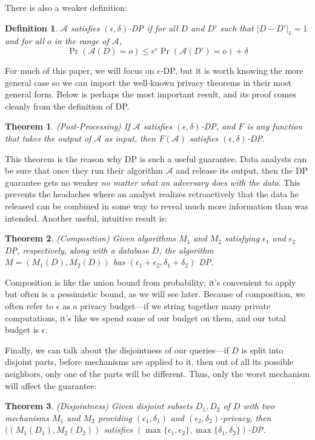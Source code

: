 \documentclass[11pt]{article}
\newtheorem{theorem}{Theorem}
\newtheorem{defn}{Definition}
\begin{document}
There is also a weaker definition: 

\begin{defn}
$\mathcal{A}$ satisfies $(\epsilon, \delta)$-DP if for all $D$ and $D'$ such that $|D-D'|_1=1$ and for all $o$ in the range of $\mathcal{A}$, 
\[\Pr\left(\mathcal{A}(D) = o \right) \leq e^{\epsilon} \Pr\left(\mathcal{A}(D')=o \right) + \delta\]
\end{defn}

For much of this paper, we will focus on $\epsilon$-DP, but it is worth knowing the more general case so we can import the well-known privacy theorems in their most general form. Below is perhaps the most important result, and its proof comes cleanly from the definition of DP.

\begin{theorem}
(Post-Processing) If $\mathcal{A}$ satisfies $(\epsilon, \delta)$-DP, and $F$ is any function that takes the output of $\mathcal{A}$ as input, then $F(\mathcal{A})$ satisfies $(\epsilon, \delta)$-DP.
\end{theorem}
This theorem is the reason why DP is such a useful guarantee. Data analysts can be sure that once they run their algorithm $\mathcal{A}$ and release its output, then the DP guarantee gets no weaker \emph{no matter what an adversary does with the data}. This prevents the headaches where an analyst realizes retroactively that the data he released can be combined in some way to reveal much more information than was intended. Another useful, intuitive result is:

\begin{theorem} \label{thm:comp}
(Composition) Given algorithms $M_1$ and $M_2$ satisfying $\epsilon_1$ and $\epsilon_2$ DP, respectively, along with a database $D$, the algorithm $M = (M_1(D), M_2(D))$ has $(\epsilon_1+\epsilon_2, \delta_1+\delta_2)$ DP.
\end{theorem}
Composition is like the union bound from probability; it's convenient to apply but often is a pessimistic bound, as we will see later. Because of composition, we often refer to $\epsilon$ as a privacy budget---if we string together many private computations, it's like we spend some of our budget on them, and our total budget is $\epsilon$.

Finally, we can talk about the disjointness of our queries---if $D$ is split into disjoint parts, before mechanisms are applied to it, then out of all its possible neighbors, only one of the parts will be different. Thus, only the worst mechanism will affect the guarantee:
\begin{theorem}\label{thm:disj}
(Disjointness) Given disjoint subsets $D_1, D_2$ of $D$ with two mechanisms $M_1$ and $M_2$ providing $(\epsilon_1, \delta_1)$ and $(\epsilon_2, \delta_2)$-privacy, then $((M_1(D_1), M_2(D_2))$ satisfies $(\max\{\epsilon_1, \epsilon_2\}, \max\{\delta_1, \delta_2\})$-DP.
\end{theorem}
\end{document}
